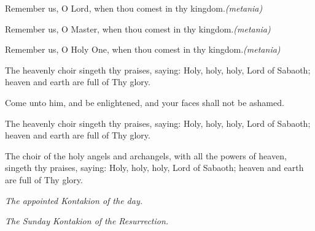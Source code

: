\documentclass[twoside, letterpaper, 12pt]{report}
\begin{document}
\newcommand\metania{\emph{(metania)}}
Remember us, O Lord, when thou comest in thy kingdom.\metania

Remember us, O Master, when thou comest in thy kingdom.\metania

Remember us, O Holy One, when thou comest in thy kingdom.\metania

The heavenly choir singeth thy praises, saying: Holy, holy, holy, Lord of Sabaoth; heaven and earth are full of Thy glory.

Come unto him, and be enlightened, and your faces shall not be ashamed.

The heavenly choir singeth thy praises, saying: Holy, holy, holy, Lord of Sabaoth; heaven and earth are full of Thy glory.

\emph{\glory}

The choir of the holy angels and archangels, with all the powers of heaven, singeth thy praises, saying: Holy, holy, holy, Lord of Sabaoth; heaven and earth are full of Thy glory.

\emph{\nowandever}













\emph{The appointed Kontakion of the day.}

\readerline{\glory}

\emph{The Sunday Kontakion of the Resurrection.}

\readerline{\nowandever}

\end{document}
